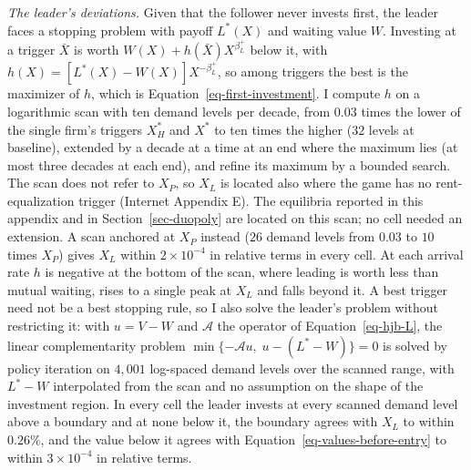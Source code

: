 \documentclass[
  11pt,
  letterpaper,
]{scrartcl}
\newcounter{none} %
\begin{document}
\emph{The leader's deviations.} Given that the follower never invests
first, the leader faces a stopping problem with payoff \(L^*(X)\) and
waiting value \(W\). Investing at a trigger \(\bar{X}\) is worth
\(W(X) + h(\bar{X})X^{\beta_L^+}\) below it, with
\(h(X) = [L^*(X) - W(X)]X^{-\beta_L^+}\), so among triggers the best is
the maximizer of \(h\), which is Equation~\ref{eq-first-investment}. I
compute \(h\) on a logarithmic scan with ten demand levels per decade,
from \(0.03\) times the lower of the single firm's triggers \(X_H^*\)
and \(X^*\) to ten times the higher (\(32\) levels at baseline),
extended by a decade at a time at an end where the maximum lies (at most
three decades at each end), and refine its maximum by a bounded search.
The scan does not refer to \(X_P\), so \(X_L\) is located also where the
game has no rent-equalization trigger (Internet Appendix E). The
equilibria reported in this appendix and in Section~\ref{sec-duopoly}
are located on this scan; no cell needed an extension. A scan anchored
at \(X_P\) instead (\(26\) demand levels from \(0.03\) to \(10\) times
\(X_P\)) gives \(X_L\) within \(2 \times 10^{-4}\) in relative terms in
every cell. At each arrival rate \(h\) is negative at the bottom of the
scan, where leading is worth less than mutual waiting, rises to a single
peak at \(X_L\) and falls beyond it. A best trigger need not be a best
stopping rule, so I also solve the leader's problem without restricting
it: with \(u = V - W\) and \(\mathcal{A}\) the operator of
Equation~\ref{eq-hjb-L}, the linear complementarity problem
\(\min\{-\mathcal{A}u,\; u - (L^* - W)\} = 0\) is solved by policy
iteration on \(4{,}001\) log-spaced demand levels over the scanned
range, with \(L^* - W\) interpolated from the scan and no assumption on
the shape of the investment region. In every cell the leader invests at
every scanned demand level above a boundary and at none below it, the
boundary agrees with \(X_L\) to within \(0.26\%\), and the value below
it agrees with Equation~\ref{eq-values-before-entry} to within
\(3 \times 10^{-4}\) in relative terms.
\end{document}
